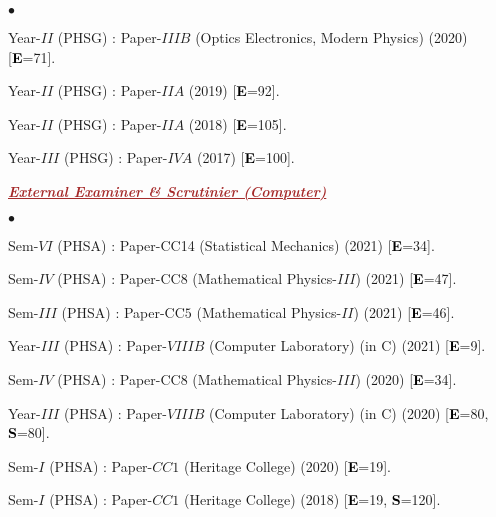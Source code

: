 \documentclass[margin,line]{res}
\newenvironment{list1}{
  \begin{list}{\ding{113}}{%
      \setlength{\itemsep}{0in}
      \setlength{\parsep}{0in} \setlength{\parskip}{0in}
      \setlength{\topsep}{0in} \setlength{\partopsep}{0in} 
      \setlength{\leftmargin}{0.17in}}}{\end{list}}
\newenvironment{list2}{
  \begin{list}{$\bullet$}{%
      \setlength{\itemsep}{0in}
      \setlength{\parsep}{0in} \setlength{\parskip}{0in}
      \setlength{\topsep}{0in} \setlength{\partopsep}{0in} 
      \setlength{\leftmargin}{0.2in}}}{\end{list}}
\begin{document}
\begin{resume}
\begin{list2}
\item Year-$II$ (PHSG) : Paper-$IIIB$ (Optics Electronics, Modern Physics) (2020) [\textcolor{black}{\bf E}=71]. 
\item Year-$II$ (PHSG) : Paper-$IIA$ (2019) [\textcolor{black}{\bf E}=92].
\item Year-$II$ (PHSG) : Paper-$IIA$ (2018) [\textcolor{black}{\bf E}=105].
\item Year-$III$ (PHSG) : Paper-$IVA$ (2017) [\textcolor{black}{\bf E}=100].
\end{list2}
\vspace{2mm}
\begin{list1}
\item[] \textcolor{brown}{\underline{\textbf{\textit{External Examiner \& Scrutinier (Computer)}}}}
\vspace{1mm}
\end{list1}
\begin{list2}
\item Sem-$VI$ (PHSA) : Paper-CC14 (Statistical Mechanics) (2021) [\textcolor{black}{\bf E}=34]. 
\item Sem-$IV$ (PHSA) : Paper-CC8 (Mathematical Physics-$III$) (2021) [\textcolor{black}{\bf E}=47]. 
\item Sem-$III$ (PHSA) : Paper-CC$5$ (Mathematical Physics-$II$) (2021) [\textcolor{black}{\bf E}=46]. 
\item Year-$III$ (PHSA) : Paper-$VIIIB$ (Computer Laboratory) (in C) (2021) [\textcolor{black}{\bf E}=9]. 
\item Sem-$IV$ (PHSA) : Paper-CC8 (Mathematical Physics-$III$) (2020) [\textcolor{black}{\bf E}=34]. 
\item Year-$III$ (PHSA) : Paper-$VIIIB$ (Computer Laboratory) (in C) (2020) [\textcolor{black}{\bf E}=80, \textcolor{black}{\bf S}=80]. 
\item Sem-$I$ (PHSA) : Paper-$CC1$ (Heritage College) (2020) [\textcolor{black}{\bf E}=19]. 
\item Sem-$I$ (PHSA) : Paper-$CC1$ (Heritage College) (2018) [\textcolor{black}{\bf E}=19, \textcolor{black}{\bf S}=120]. 
\end{list2}


\end{resume}
\end{document}
